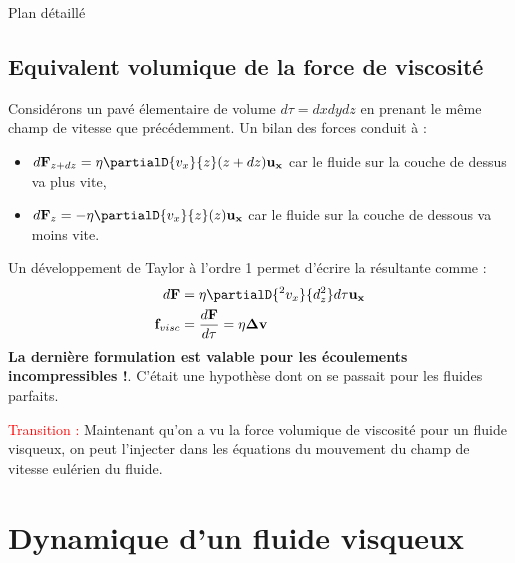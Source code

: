 \begin{reportBlock}{Plan détaillé}
  \subsection{Equivalent volumique de la force de viscosité}
Considérons un pavé élementaire de volume $d\tau=dxdydz$ en prenant le même champ de vitesse que précédemment. Un bilan des forces conduit à :
\begin{itemize}
    \item $d\mathbf{F}_{z+dz}=\eta\partialD{v_x}{z}(z+dz)\mathbf{u_x}$ car le fluide sur la couche de dessus va plus vite,
    \item  $d\mathbf{F}_{z}=-\eta\partialD{v_x}{z}(z)\mathbf{u_x}$ car le fluide sur la couche de dessous va moins vite.
\end{itemize}
Un développement de Taylor à l'ordre 1 permet d'écrire la résultante comme :
\begin{align}
    d\mathbf{F} &= \eta\partialD{^2v_x}{d_z^2}d\tau\mathbf{u_x} \\
    \mathbf{f}_{visc}&=\frac{d\mathbf{F}}{d\tau} = \eta\mathbf{\Delta v}
\end{align}
\textbf{La dernière formulation est valable pour les écoulements incompressibles !}. C'était une hypothèse dont on se passait pour les fluides parfaits.


  
  \textcolor{red}{Transition :} Maintenant qu'on a vu la force volumique de viscosité pour un fluide visqueux, on peut l'injecter dans les équations du mouvement du champ de vitesse eulérien du fluide.

  \section{Dynamique d'un fluide visqueux}


\end{reportBlock}
